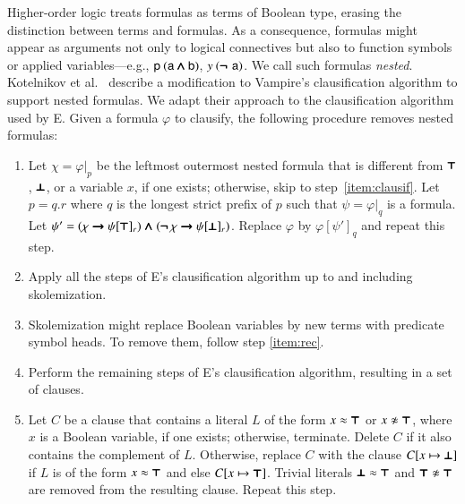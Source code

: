 \begin{rep}
Higher-order logic treats formulas as terms of Boolean type, erasing
the distinction between terms and formulas. As a consequence, formulas might appear
as arguments not only to logical connectives but also to function symbols
or applied variables---e.g., $\mathsf{p} \> (\mathsf{a} \pmb\land \mathsf{b})$,
$y \> (\pmb{\neg\,}\, \mathsf{a})$.
We call such formulas \emph{nested}. Kotelnikov et al.\
\cite{kotelnikov-16-fool} describe a modification to
Vampire's clausification algorithm to support nested formulas. We adapt
their approach to the clausification algorithm
\cite{nw-01-small-cnf} used by E. Given a formula $\varphi$ to
clausify, the following procedure removes nested formulas:
%
\begin{enumerate}
  \item\label{item:rec}
    Let $\chi = \varphi|_{p}$ be the leftmost outermost nested formula that is different from
    $\pmb\top$, $\pmb\bot$, or a variable $x$, if one exists;
    otherwise, skip to step~\ref{item:clausif}.
    Let $p = q.r$ where $q$ is the longest strict prefix of $p$ such that $\psi = \varphi|_q$ is a formula.
    Let $\psi' = (\chi \mathrel{\pmb\rightarrow} \psi[\pmb\top]_r)
    \mathrel{\pmb\land} (\pmb{\neg\,}\chi \mathrel{\pmb\rightarrow} \psi[\pmb\bot]_r)$.
    Replace $\varphi$ by $\varphi[\psi']_q$ and repeat this step.
  \item\label{item:clausif}
    Apply all the steps of E's clausification algorithm up to and
    including skolemization.
  \item Skolemization might replace Boolean variables by new terms with
    predicate symbol heads. To remove them, follow step \ref{item:rec}.
  \item Perform the remaining steps of E's clausification algorithm,
    resulting in a set of clauses.
  \item Let $C$ be a clause that contains a literal $L$ of the form $x \approx \pmb\top$ or $x \noteq \itrue$, where $x$
    is a Boolean variable, if one exists; otherwise, terminate.
    Delete $C$ if it also contains the complement of $L$.
    Otherwise, replace $C$ with the clause $C[x \mapsto \pmb\bot]$
    if $L$ is of the form $x \approx \pmb\top$ and else $C[x \mapsto \pmb\top]$.
    Trivial literals $\pmb\bot \approx \pmb\top$ and $\itrue \noteq \itrue$ are removed from
    the resulting clause. Repeat this step.
\end{enumerate}



\end{rep}
